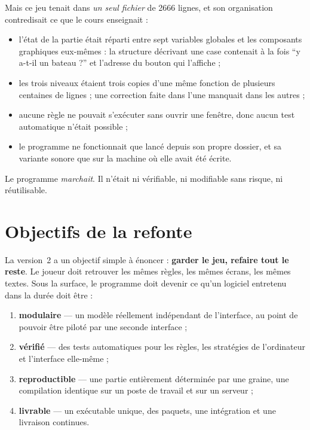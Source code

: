 Mais ce jeu tenait dans \emph{un seul fichier} de \num{2666} lignes, et son organisation
contredisait ce que le cours enseignait :

\begin{itemize}
  \item l'état de la partie était réparti entre sept variables globales et les composants
        graphiques eux-mêmes : la structure décrivant une case contenait à la fois
        \enquote{y a-t-il un bateau ?} et l'adresse du bouton qui l'affiche ;
  \item les trois niveaux étaient trois copies d'une même fonction de plusieurs centaines de
        lignes ; une correction faite dans l'une manquait dans les autres ;
  \item aucune règle ne pouvait s'exécuter sans ouvrir une fenêtre, donc aucun test
        automatique n'était possible ;
  \item le programme ne fonctionnait que lancé depuis son propre dossier, et sa variante
        sonore que sur la machine où elle avait été écrite.
\end{itemize}

Le programme \emph{marchait}. Il n'était ni vérifiable, ni modifiable sans risque, ni
réutilisable.

\section{Objectifs de la refonte}

La version~2 a un objectif simple à énoncer : \textbf{garder le jeu, refaire tout le reste}.
Le joueur doit retrouver les mêmes règles, les mêmes écrans, les mêmes textes. Sous la
surface, le programme doit devenir ce qu'un logiciel entretenu dans la durée doit être :

\begin{enumerate}
  \item \textbf{modulaire} --- un modèle réellement indépendant de l'interface, au point de
        pouvoir être piloté par une seconde interface ;
  \item \textbf{vérifié} --- des tests automatiques pour les règles, les stratégies de
        l'ordinateur et l'interface elle-même ;
  \item \textbf{reproductible} --- une partie entièrement déterminée par une graine, une
        compilation identique sur un poste de travail et sur un serveur ;
  \item \textbf{livrable} --- un exécutable unique, des paquets, une intégration et une
        livraison continues.
\end{enumerate}

